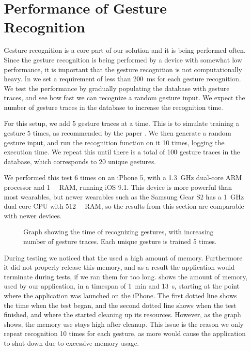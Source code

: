 \section{Performance of Gesture Recognition}\label{sec:gestureperformance}
Gesture recognition is a core part of our solution and it is being performed often. 
Since the gesture recognition is being performed by a device with somewhat low performance,
it is important that the gesture recognition is not computationally heavy.
In  we set a requirement of less than \SI{200}{\milli\second} for each gesture recognition.
We test the performance by gradually populating the database with gesture traces, 
and see how fast we can recognize a random gesture input.
We expect the number of gesture traces in the database to increase the recognition time.

For this setup, we add \num{5} gesture traces at a time. 
This is to simulate training a gesture \num{5} times, 
as recommended by the \threedollar paper \cite{threedollar}. 
We then generate a random gesture input, 
and run the recognition function on it \num{10} times, 
logging the execution time.
We repeat this until there is a total of \num{100} gesture traces in the database, 
which corresponds to \num{20} unique gestures.

We performed this test \num{6} times on an iPhone 5, 
with a \SI{1.3}{\giga\hertz} dual-core ARM processor and \SI{1}{\giga\byte} RAM, running iOS 9.1.
This device is more powerful than most wearables, 
but newer wearables such as the Samsung Gear S2 has a \SI{1}{\giga\hertz} dual core CPU with \SI{512}{\mega\byte} RAM, 
so the results from this section are comparable with newer devices.

\begin{figure}[!htb]
    \centering
    
    \caption{Graph showing the time of recognizing gestures, with increasing number of gesture traces. Each unique gesture is trained \num{5} times.}
    \label{fig:performancegraph}
\end{figure}

During testing we noticed that the \threedollar used a high amount of memory. 
Furthermore it did not properly release this memory, 
and as a result the application would terminate during tests, 
if we ran them for too long.
 shows the amount of memory, 
used by our application, 
in a timespan of \SI{1}{\minute} and \SI{13}{\second}, 
starting at the point where the application was launched on the iPhone. 
The first dotted line shows the time when the test began, 
and the second dotted line shows when the test finished, 
and where the \threedollar started cleaning up its resources.
However, as the graph shows, the memory use stays high after cleanup. %
This issue is the reason we only repeat recognition \num{10} times for each gesture, 
as more would cause the application to shut down due to excessive memory usage. %

